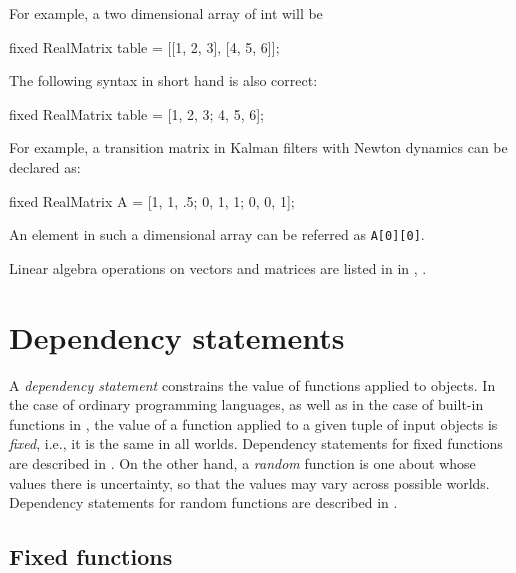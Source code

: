 \documentclass[12pt]{article}
\renewcommand{\optional}[1]{} %
\begin{document}
For example, a two dimensional array of int will be
\begin{blogcode}
fixed RealMatrix table = [[1, 2, 3], [4, 5, 6]];
\end{blogcode}
The following syntax in short hand is also correct:
\begin{blogcode}
fixed RealMatrix table = [1, 2, 3; 4, 5, 6];
\end{blogcode}


For example, a transition matrix in Kalman  filters with Newton dynamics can be declared as:
\begin{blogcode}
fixed RealMatrix A = [1, 1, .5; 0, 1, 1; 0, 0, 1];
\end{blogcode}
An element in such a dimensional array can be referred as \texttt{A[0][0]}.

\optional{
\subsection{Size of an array}\label{-section}
There are two special functions to obtain the size of an array, \texttt{length(\mycdot)} and \texttt{size(\mycdot)}.
\texttt{length(\mycdot)} returns the length of one dimensional array, while \texttt{size(\mycdot)} returns the lengths of all dimensions
of a multidimensional array.  In the above example, \texttt{length(table)} equals 3, and \texttt{size(table)} equals \texttt{[2, 3]}.
}

Linear algebra operations on vectors and matrices are listed in
in , .


\section{Dependency statements}\label{dependency-section}

A {\em dependency statement} constrains the value of functions applied to objects. In the case of ordinary programming languages,
as well as in the case of built-in functions in \bl, the value of a function applied to a given tuple of input objects is {\em fixed},
i.e., it is the same in all worlds. Dependency statements for fixed functions are described in . On the other hand, a {\em random} function
is one about whose values there is uncertainty, so that the values may vary across possible worlds. Dependency statements for random functions are described in .

\subsection{Fixed functions}\label{fixed-section}
\end{document}
